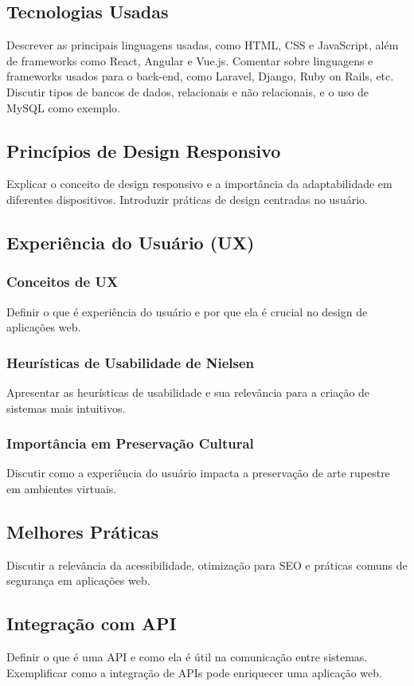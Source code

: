 \subsection{Tecnologias Usadas}
Descrever as principais linguagens usadas, como HTML, CSS e JavaScript, além de frameworks como React, Angular e Vue.js. Comentar sobre linguagens e frameworks usados para o back-end, como Laravel, Django, Ruby on Rails, etc. Discutir tipos de bancos de dados, relacionais e não relacionais, e o uso de MySQL como exemplo.

\subsection{Princípios de Design Responsivo}
Explicar o conceito de design responsivo e a importância da adaptabilidade em diferentes dispositivos. Introduzir práticas de design centradas no usuário.

\subsection{Experiência do Usuário (UX)}
\subsubsection{Conceitos de UX}
Definir o que é experiência do usuário e por que ela é crucial no design de aplicações web.

\subsubsection{Heurísticas de Usabilidade de Nielsen}
Apresentar as heurísticas de usabilidade e sua relevância para a criação de sistemas mais intuitivos.

\subsubsection{Importância em Preservação Cultural}
Discutir como a experiência do usuário impacta a preservação de arte rupestre em ambientes virtuais.

\subsection{Melhores Práticas}
Discutir a relevância da acessibilidade, otimização para SEO e práticas comuns de segurança em aplicações web.

\subsection{Integração com API}
Definir o que é uma API e como ela é útil na comunicação entre sistemas. Exemplificar como a integração de APIs pode enriquecer uma aplicação web.

